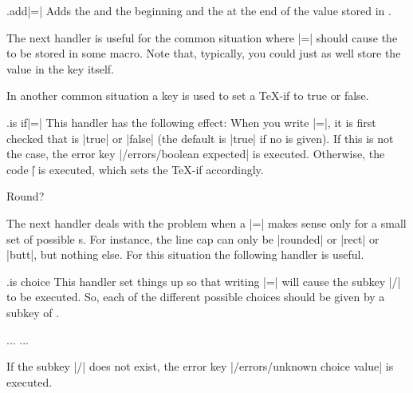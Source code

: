 \begin{handler}{{.add}|=|}
  Adds the  and the beginning and the  at the end of the value stored in .
\end{handler}

The next handler is useful for the common situation where
|=| should cause the  to be stored
in some macro. Note that, typically, you could just as well store the
value in the key itself.


In another common situation a key is used to set a \TeX-if to true or
false. 

\begin{handler}{{.is if}|=|}
  This handler has the following effect: When you write
  |=|, it is first checked that  is
  |true| or |false| (the default is |true| if no  is
  given). If this is not the case, the error key
  |/errors/boolean expected| is executed. Otherwise, 
  the code |\| is executed, which sets
  the \TeX-if accordingly.
\begin{codeexample}[]
\newif\iftheworldisflat    
{}
\iftheworldisflat
  Flat
\else
  Round?
\fi
\end{codeexample}
\end{handler}

The next handler deals with the problem when a
|=| makes sense only for a small set of possible
s. For instance, the line cap can only be |rounded| or
|rect| or |butt|, but nothing else. For this situation the following
handler is useful.

\begin{handler}{{.is choice}}
  This handler set things up so that writing |=|
  will cause the subkey |/| to be executed. So,
  each of the different possible choices should be given by a subkey
  of .
\begin{codeexample}
...
\draw [/line cap=butt] ...
\end{codeexample}
  If the subkey |/| does not exist, the error
  key |/errors/unknown choice value| is executed.
\end{handler}

